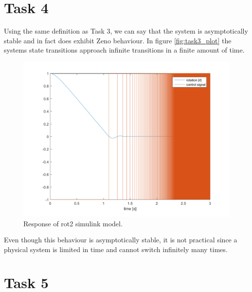 \documentclass[a4paper,12pt,oneside,onecolumn]{article} %
\begin{document}
\section*{Task 4}
        Using the same definition as Task 3, we can say that the system
        is asymptotically stable and in fact does exhibit Zeno
        behaviour. In figure \ref{fig:task3_plot} the systems state
        transitions approach infinite transitions in a finite amount of time. 
	\begin{figure}[H]
        \centering
        \includegraphics[scale = 0.5]{../matlab/images/task4_plot.png}
        \caption{Response of rot2 simulink model.}
        \label{fig:task4_plot}
    \end{figure}
Even though this behaviour is asymptotically stable, it is not practical since a physical system is limited in time and cannot switch infinitely many times.
\section*{Task 5}
\end{document}
